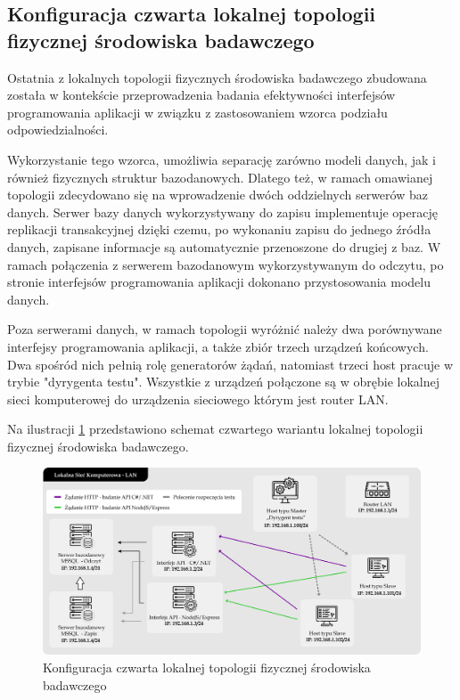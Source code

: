 \subsection*{Konfiguracja czwarta lokalnej topologii fizycznej środowiska badawczego}
\label{sec:lokalne-srodowisko-badawcze-ver-4}
Ostatnia z lokalnych topologii fizycznych środowiska badawczego zbudowana została w kontekście przeprowadzenia badania efektywności interfejsów programowania aplikacji w związku z zastosowaniem wzorca podziału odpowiedzialności.

Wykorzystanie tego wzorca, umożliwia separację zarówno modeli danych, jak i również fizycznych struktur bazodanowych. Dlatego też, w ramach omawianej topologii zdecydowano się na wprowadzenie dwóch oddzielnych serwerów baz danych. Serwer bazy danych wykorzystywany do zapisu implementuje operację replikacji transakcyjnej dzięki czemu, po wykonaniu zapisu do jednego źródła danych, zapisane informacje są automatycznie przenoszone do drugiej z baz. W ramach połączenia z serwerem bazodanowym wykorzystywanym do odczytu, po stronie interfejsów programowania aplikacji dokonano przystosowania modelu danych.

Poza serwerami danych, w ramach topologii wyróżnić należy dwa porównywane interfejsy programowania aplikacji, a także zbiór trzech urządzeń końcowych. Dwa spośród nich pełnią rolę generatorów żądań, natomiast trzeci host pracuje w trybie "dyrygenta testu". Wszystkie z urządzeń połączone są w obrębie lokalnej sieci komputerowej do urządzenia sieciowego którym jest router LAN.

Na ilustracji \ref{fig:topologia-5} przedstawiono schemat czwartego wariantu lokalnej topologii fizycznej środowiska badawczego.

\clearpage

\begin{figure}[ht]
    \centering
     \includegraphics[width=\linewidth]{rys04/topologia-5.png}
    \caption{Konfiguracja czwarta lokalnej topologii fizycznej środowiska badawczego}
    \label{fig:topologia-5}
\end{figure}

